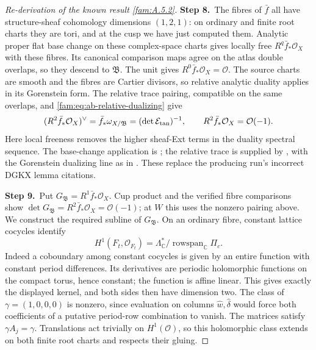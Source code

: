 \documentclass[11pt,a4paper]{article}
\theoremstyle{plain}
\theoremstyle{definition}
\begin{document}
\begin{proof}[Re-derivation of the known result \ref{fam:A.5.2}]
\par\smallskip\noindent\textbf{Step 8.}\ The fibres of $\bar f$ all have structure-sheaf cohomology dimensions
$(1,2,1)$: on ordinary and finite root charts they are tori, and at
the cusp we have just computed them. Analytic proper flat base change
on these complex-space charts gives locally free $R^q\bar f_*\mathcal O_X$
with these fibres. Its canonical comparison maps agree on the atlas
double overlaps, so they descend to $\mathfrak B$. The unit gives
$R^0\bar f_*\mathcal O_X=\mathcal O$.
The source charts are smooth and the fibres are Cartier divisors,
so relative analytic duality applies in its Gorenstein form. The
relative trace pairing, compatible on the same overlaps, and
\eqref{fam:eq:ab-relative-dualizing} give
\[
 (R^2\bar f_*\mathcal O_X)^\vee
 =\bar f_*\omega_{X/\mathfrak B}
 =(\det\mathcal E_{\rm tan})^{-1},
 \qquad R^2\bar f_*\mathcal O_X=\mathcal O(-1).
\]
Here local freeness removes the higher sheaf-Ext terms in the duality
spectral sequence. The base-change application is \cite[III.4.10 and III.4.12]{BS76}; the relative trace is supplied by \cite[pp.~261, 264--266]{RRV71}, with the Gorenstein dualizing line as in \cite[p.~91, Proposition 2]{RR70}. These replace the producing run's incorrect DGKX lemma citations.

\par\smallskip\noindent\textbf{Step 9.}\ Put $G_{\mathfrak B}=R^1\bar f_*\mathcal O_X$. Cup product and the verified fibre
comparisons show $\det G_{\mathfrak B}=R^2\bar f_*\mathcal O_X=\mathcal O(-1)$;
at $W$ this uses the nonzero pairing above.
We construct the required subline of $G_{\mathfrak B}$. On an ordinary fibre,
constant lattice cocycles identify
\[
 H^1(F_t,\mathcal O_{F_t})
 =\Lambda_{\mathbb C}^*/\operatorname{rowspan}_{\mathbb C}\Pi_c.
\]
Indeed a coboundary among constant cocycles is given by an entire
function with constant period differences. Its derivatives are
periodic holomorphic functions on the compact torus, hence constant;
the function is affine linear. This gives exactly the displayed
kernel, and both sides then have dimension two. The class of
$\gamma=(1,0,0,0)$ is nonzero, since evaluation on columns
$\widehat w,\widehat\delta$ would force both coefficients of a
putative period-row combination to vanish.
The matrices satisfy $\gamma A_j=\gamma$. Translations act trivially
on $H^1(\mathcal O)$, so this holomorphic class extends on both finite
root charts and respects their gluing.


\end{proof}
\end{document}
